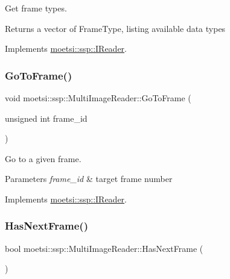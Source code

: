Get frame types. 

\begin{DoxyReturn}{Returns}
a vector of Frame\+Type, listing available data types 
\end{DoxyReturn}


Implements \hyperlink{classmoetsi_1_1ssp_1_1IReader_a4116c1931fde7bd66133934ffdca1cce}{moetsi\+::ssp\+::\+I\+Reader}.

\mbox{\label{classmoetsi_1_1ssp_1_1MultiImageReader_a7c552a1ad469660ea0a88b9ca85138ad}} 
\subsubsection{\texorpdfstring{Go\+To\+Frame()}{GoToFrame()}}
{\footnotesize\ttfamily void moetsi\+::ssp\+::\+Multi\+Image\+Reader\+::\+Go\+To\+Frame (\begin{DoxyParamCaption}\item[{unsigned int}]{frame\+\_\+id }\end{DoxyParamCaption})\hspace{0.3cm}{\ttfamily [virtual]}}



Go to a given frame. 


\begin{DoxyParams}{Parameters}
{\em frame\+\_\+id} & target frame number \\
\hline
\end{DoxyParams}


Implements \hyperlink{classmoetsi_1_1ssp_1_1IReader_a6f1be3c06538992cca6d550bd9566681}{moetsi\+::ssp\+::\+I\+Reader}.

\mbox{\label{classmoetsi_1_1ssp_1_1MultiImageReader_a04240c98d28d8949fca4ecdcb04f04f5}} 
\subsubsection{\texorpdfstring{Has\+Next\+Frame()}{HasNextFrame()}}
{\footnotesize\ttfamily bool moetsi\+::ssp\+::\+Multi\+Image\+Reader\+::\+Has\+Next\+Frame (\begin{DoxyParamCaption}{ }\end{DoxyParamCaption})\hspace{0.3cm}{\ttfamily [virtual]}}



